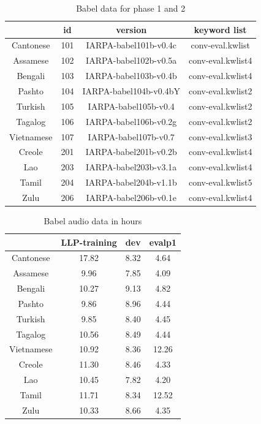\documentclass[journal]{IEEEtran}
\begin{document}
\begin{table}[!t]
  \caption{Babel data for phase 1 and 2}
  \label{tab:version}
  \centering
  \begin{tabular}{|c|c|c|c|}
    \hline
    & id  & version & keyword list\\
    \hline
    Cantonese & 101 & IARPA-babel101b-v0.4c & conv-eval.kwlist \\
    Assamese  & 102 & IARPA-babel102b-v0.5a & conv-eval.kwlist4 \\
    Bengali   & 103 & IARPA-babel103b-v0.4b & conv-eval.kwlist4 \\
    Pashto    & 104 & IARPA-babel104b-v0.4bY & conv-eval.kwlist2 \\
    Turkish   & 105 & IARPA-babel105b-v0.4 &  conv-eval.kwlist2 \\
    Tagalog   & 106 & IARPA-babel106b-v0.2g & conv-eval.kwlist2 \\
    Vietnamese & 107 & IARPA-babel107b-v0.7 & conv-eval.kwlist3 \\
    Creole    & 201 & IARPA-babel201b-v0.2b & conv-eval.kwlist4 \\
    Lao       & 203 & IARPA-babel203b-v3.1a & conv-eval.kwlist4 \\
    Tamil     & 204 & IARPA-babel204b-v1.1b & conv-eval.kwlist5 \\
    Zulu      & 206 & IARPA-babel206b-v0.1e & conv-eval.kwlist4 \\
    \hline
  \end{tabular}
\end{table}

\begin{table}[!t]
  \caption{Babel audio data in hours}
  \label{tab:hours}
  \centering
  \begin{tabular}{|c|c|c|c|}
    \hline
              & LLP-training & dev & evalp1 \\
    \hline
    Cantonese & 17.82 & 8.32 & 4.64 \\
    Assamese  & 9.96  & 7.85 & 4.09 \\
    Bengali   & 10.27 & 9.13 & 4.82 \\
    Pashto    & 9.86  & 8.96 & 4.44 \\
    Turkish   & 9.85  & 8.40 & 4.45 \\
    Tagalog   & 10.56 & 8.49 & 4.44 \\
    Vietnamese& 10.92 & 8.36 & 12.26 \\
    Creole    & 11.30 & 8.46 & 4.33 \\
    Lao       & 10.45 & 7.82 & 4.20 \\
    Tamil     & 11.71 & 8.34 & 12.52 \\
    Zulu      & 10.33 & 8.66 & 4.35 \\
    \hline
  \end{tabular}
\end{table}
\end{document}
